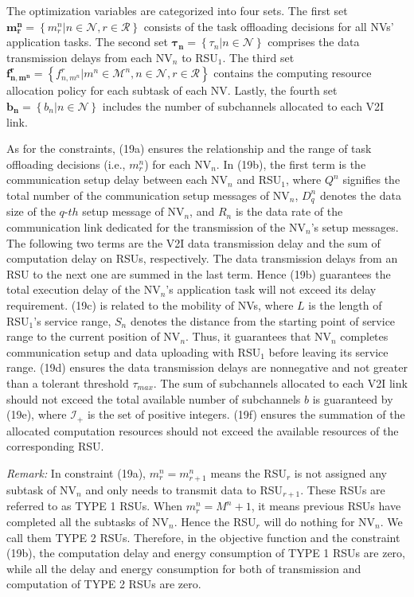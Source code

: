 \documentclass[lettersize,journal]{IEEEtran}
\begin{document}
The optimization variables are categorized into four sets. The first set $\mathbf{m_r^n} = \left\{ m^n_r|n \in \mathcal{N}, r \in \mathcal{R} \right\}$ consists of the task offloading decisions for all NVs' application tasks. The second set $\mathbf{\tau_n} = \left\{ \tau_{n}|n \in \mathcal{N} \right\}$ comprises the data transmission delays from each NV$_n$ to RSU$_1$. The third set $\mathbf{f^{r}_{n,m^n}} = \left\{ f^{r}_{n,m^n}|m^n \in \mathcal{M}^n,n \in \mathcal{N},r \in \mathcal{R} \right\}$ contains the computing resource allocation policy for each subtask of each NV. Lastly, the fourth set $\mathbf{b_n} = \left \{b_n|n \in \mathcal {N}\right \}$ includes the number of subchannels allocated to each V2I link.

As for the constraints, (19a) ensures the relationship and the range of task offloading decisions (i.e., $m^n_r$) for each NV$_n$. In (19b), the first term is the communication setup delay between each NV$_n$ and RSU$_1$, where $Q^n$ signifies the total number of the communication setup messages of NV$_n$, $D^n_q$ denotes the data size of the $q\mbox{-}th$ setup message of NV$_n$, and $R_{n}$ is the data rate of the communication link dedicated for the transmission of the NV$_n$'s setup messages. The following two terms are the V2I data transmission delay and the sum of computation delay on RSUs, respectively. The data transmission delays from an RSU to the next one are summed in the last term. Hence (19b) guarantees the total execution delay of the NV$_n$'s application task will not exceed its delay requirement. (19c) is related to the mobility of NVs, where $L$ is the length of RSU$_1$'s service range, $S_n$ denotes the distance from the starting point of service range to the current position of NV$_n$. Thus, it guarantees that NV$_n$ completes communication setup and data uploading with RSU$_1$ before leaving its service range. (19d) ensures the data transmission delays are nonnegative and not greater than a tolerant threshold $\tau_{max}$. The sum of subchannels allocated to each V2I link should not exceed the total available number of subchannels $b$ is guaranteed by (19e), where $\mathcal{I}_+$ is the set of positive integers. (19f) ensures the summation of the allocated computation resources should not exceed the available resources of the corresponding RSU.


\emph{Remark:} In constraint (19a), $m^n_r=m^n_{r+1}$ means the RSU$_r$ is not assigned any subtask of NV$_n$ and only needs to transmit data to RSU$_{r+1}$. These RSUs are referred to as TYPE 1 RSUs. When $m^n_r=M^n+1$, it means previous RSUs have completed all the subtasks of NV$_n$. Hence the RSU$_r$ will do nothing for NV$_n$. We call them TYPE 2 RSUs. Therefore, in the objective function and the constraint (19b), the computation delay and energy consumption of TYPE 1 RSUs are zero, while all the delay and energy consumption for both of transmission and computation of TYPE 2 RSUs are zero.
\end{document}
